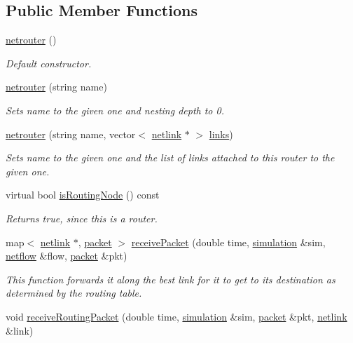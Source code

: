 \subsection*{Public Member Functions}
\begin{DoxyCompactItemize}
\item 
\hyperlink{classnetrouter_a8ab7ff9ad09156e92ce58f229e158ce8}{netrouter} ()
\begin{DoxyCompactList}\small\item\em Default constructor. \end{DoxyCompactList}\item 
\hyperlink{classnetrouter_aa489048e7f69c270c509033ad1987d2f}{netrouter} (string name)
\begin{DoxyCompactList}\small\item\em Sets name to the given one and nesting depth to 0. \end{DoxyCompactList}\item 
\hyperlink{classnetrouter_ab0da794c63d0b3e7a5335670eab80098}{netrouter} (string name, vector$<$ \hyperlink{classnetlink}{netlink} $\ast$ $>$ \hyperlink{classnetnode_af481c4109393b79170f523ca92bea507}{links})
\begin{DoxyCompactList}\small\item\em Sets name to the given one and the list of links attached to this router to the given one. \end{DoxyCompactList}\item 
virtual bool \hyperlink{classnetrouter_a1fa1b2262b7427485b31b2d90477b6e7}{is\-Routing\-Node} () const 
\begin{DoxyCompactList}\small\item\em Returns true, since this is a router. \end{DoxyCompactList}\item 
map$<$ \hyperlink{classnetlink}{netlink} $\ast$, \hyperlink{classpacket}{packet} $>$ \hyperlink{classnetrouter_a997f1c4c9951bc1a8323896db58a22ea}{receive\-Packet} (double time, \hyperlink{classsimulation}{simulation} \&sim, \hyperlink{classnetflow}{netflow} \&flow, \hyperlink{classpacket}{packet} \&pkt)
\begin{DoxyCompactList}\small\item\em This function forwards it along the best link for it to get to its destination as determined by the routing table. \end{DoxyCompactList}\item 
void \hyperlink{classnetrouter_af6e40bf81506f250c6f638df89cdb1c2}{receive\-Routing\-Packet} (double time, \hyperlink{classsimulation}{simulation} \&sim, \hyperlink{classpacket}{packet} \&pkt, \hyperlink{classnetlink}{netlink} \&link)

\end{DoxyCompactItemize}
